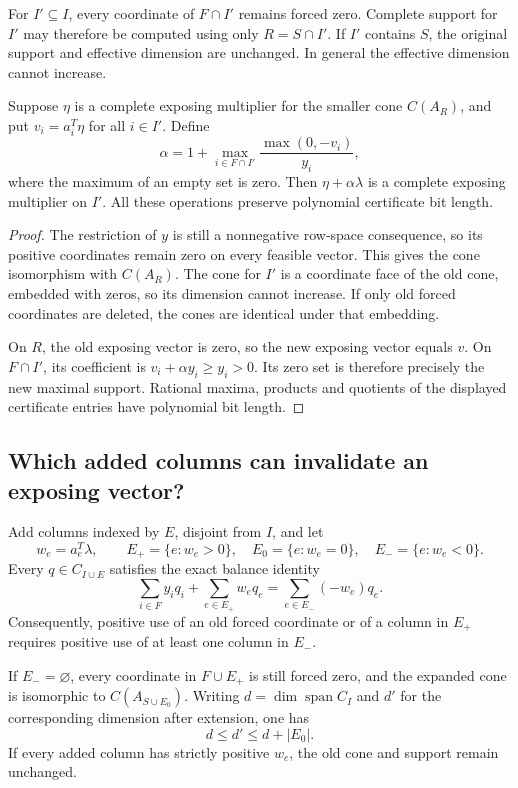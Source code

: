 \begin{proposition}
For $I'\subseteq I$, every coordinate of $F\cap I'$ remains forced
zero.  Complete support for $I'$ may therefore be computed using only
$R=S\cap I'$.  If $I'$ contains $S$, the original support and effective
dimension are unchanged.  In general the effective dimension cannot
increase.

Suppose $\eta$ is a complete exposing multiplier for the smaller cone
$C(A_R)$, and put $v_i=a_i^T\eta$ for all $i\in I'$.  Define
\[
 \alpha=1+\max_{i\in F\cap I'}
              \frac{\max(0,-v_i)}{y_i},
\]
where the maximum of an empty set is zero.  Then
$\eta+\alpha\lambda$ is a complete exposing multiplier on $I'$.
All these operations preserve polynomial certificate bit length.
\end{proposition}

\begin{proof}
The restriction of $y$ is still a nonnegative row-space consequence,
so its positive coordinates remain zero on every feasible vector.
This gives the cone isomorphism with $C(A_R)$.  The cone for $I'$ is a
coordinate face of the old cone, embedded with zeros, so its dimension
cannot increase.  If only old forced coordinates are deleted, the cones
are identical under that embedding.

On $R$, the old exposing vector is zero, so the new exposing vector
equals $v$.  On $F\cap I'$, its coefficient is
$v_i+\alpha y_i\geq y_i>0$.  Its zero set is therefore precisely the
new maximal support.  Rational maxima, products and quotients of the
displayed certificate entries have polynomial bit length.
\end{proof}

\subsection{Which added columns can invalidate an exposing vector?}

\begin{theorem}
Add columns indexed by $E$, disjoint from $I$, and let
\[
 w_e=a_e^T\lambda,\qquad
 E_+=\{e:w_e>0\},\quad E_0=\{e:w_e=0\},\quad
 E_-=\{e:w_e<0\}.
\]
Every $q\in C_{I\cup E}$ satisfies the exact balance identity
\begin{equation}\label{eq:audit-portal}
 \sum_{i\in F}y_iq_i+\sum_{e\in E_+}w_eq_e
       =\sum_{e\in E_-}(-w_e)q_e.
\end{equation}
Consequently, positive use of an old forced coordinate or of a column
in $E_+$ requires positive use of at least one column in $E_-$.

If $E_-=\varnothing$, every coordinate in $F\cup E_+$ is still forced
zero, and the expanded cone is isomorphic to $C(A_{S\cup E_0})$.
Writing $d=\dim\operatorname{span}C_I$ and $d'$ for the corresponding
dimension after extension, one has
\[
 d\leq d'\leq d+|E_0|.
\]
If every added column has strictly positive $w_e$, the old cone and
support remain unchanged.
\end{theorem}

